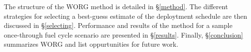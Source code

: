 The structure of the WORG method is detailed in \S\ref{method}. 
The different strategies for selecting a best-guess estimate of the 
deploytment schedule are then discussed in \S\ref{selecting}. Performance
and results of the method for a sample once-through fuel cycle scenario 
are presented in \S\ref{results}. Finally, \S\ref{conclusion} summarizes
WORG and list oppurtunities for future work.
